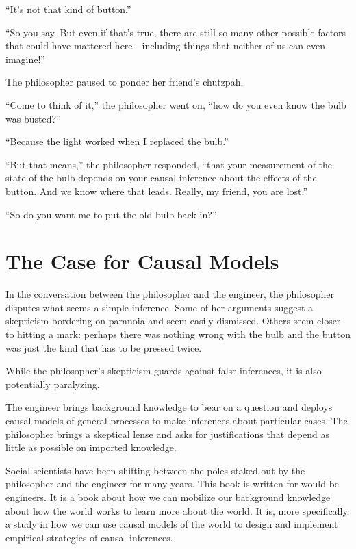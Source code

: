 \documentclass[
  12pt,
]{book}
\begin{document}
``It's not that kind of button.''

``So you say. But even if that's true, there are still so many other possible factors that could have mattered here---including things that neither of us can even imagine!''

The philosopher paused to ponder her friend's chutzpah.

``Come to think of it,'' the philosopher went on, ``how do you even know the bulb was busted?''

``Because the light worked when I replaced the bulb.''

``But that means,'' the philosopher responded, ``that your measurement of the state of the bulb depends on your causal inference about the effects of the button. And we know where that leads. Really, my friend, you are lost.''

``So do you want me to put the old bulb back in?''

\hypertarget{the-case-for-causal-models}{%
\section{The Case for Causal Models}\label{the-case-for-causal-models}}

In the conversation between the philosopher and the engineer, the philosopher disputes what seems a simple inference. Some of her arguments suggest a skepticism bordering on paranoia and seem easily dismissed. Others seem closer to hitting a mark: perhaps there was nothing wrong with the bulb and the button was just the kind that has to be pressed twice.

While the philosopher's skepticism guards against false inferences, it is also potentially paralyzing.

The engineer brings background knowledge to bear on a question and deploys causal models of general processes to make inferences about particular cases. The philosopher brings a skeptical lense and asks for justifications that depend as little as possible on imported knowledge.

Social scientists have been shifting between the poles staked out by the philosopher and the engineer for many years. This book is written for would-be engineers. It is a book about how we can mobilize our background knowledge about how the world works to learn more about the world. It is, more specifically, a study in how we can use causal models of the world to design and implement empirical strategies of causal inferences.
\end{document}
